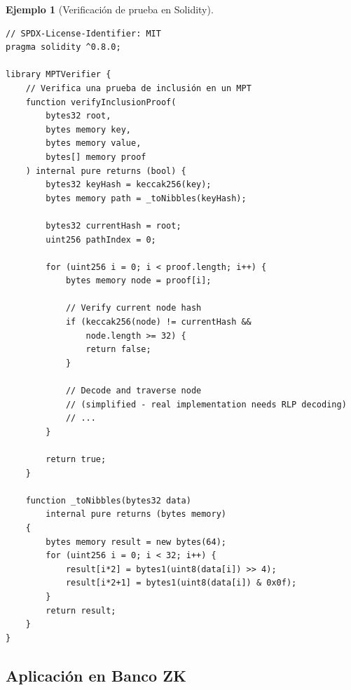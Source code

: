 \documentclass[11pt,a4paper,twoside,openright]{book}
\theoremstyle{definition}
\newtheorem{example}{Ejemplo}[chapter]
\theoremstyle{plain}
\theoremstyle{remark}
\begin{document}
\begin{example}[Verificación de prueba en Solidity]
\begin{verbatim}
// SPDX-License-Identifier: MIT
pragma solidity ^0.8.0;

library MPTVerifier {
    // Verifica una prueba de inclusión en un MPT
    function verifyInclusionProof(
        bytes32 root,
        bytes memory key,
        bytes memory value,
        bytes[] memory proof
    ) internal pure returns (bool) {
        bytes32 keyHash = keccak256(key);
        bytes memory path = _toNibbles(keyHash);
        
        bytes32 currentHash = root;
        uint256 pathIndex = 0;
        
        for (uint256 i = 0; i < proof.length; i++) {
            bytes memory node = proof[i];
            
            // Verify current node hash
            if (keccak256(node) != currentHash && 
                node.length >= 32) {
                return false;
            }
            
            // Decode and traverse node
            // (simplified - real implementation needs RLP decoding)
            // ...
        }
        
        return true;
    }
    
    function _toNibbles(bytes32 data) 
        internal pure returns (bytes memory) 
    {
        bytes memory result = new bytes(64);
        for (uint256 i = 0; i < 32; i++) {
            result[i*2] = bytes1(uint8(data[i]) >> 4);
            result[i*2+1] = bytes1(uint8(data[i]) & 0x0f);
        }
        return result;
    }
}
\end{verbatim}
\end{example}

\subsection{Aplicación en Banco ZK}
\end{document}
